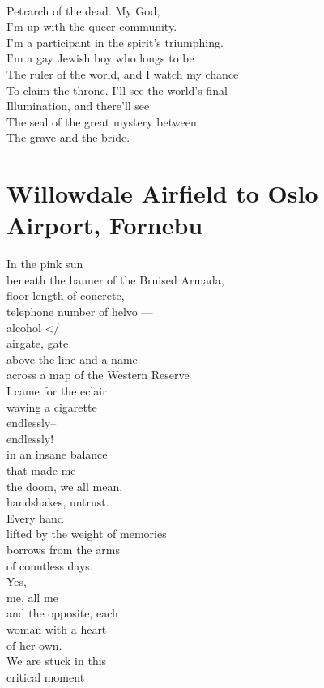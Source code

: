 \documentclass[smalldemyvopaper,11pt,twoside,onecolumn,openright,extrafontsizes]{memoir}
\begin{document}
\\Petrarch of the dead. My God,
\\I'm up with the queer community.
\\I'm a participant in the spirit's triumphing.
\\I'm a gay Jewish boy who longs to be
\\The ruler of the world, and I watch my chance
\\To claim the throne. I'll see the world's final
\\Illumination, and there'll see
\\The seal of the great mystery between
\\The grave and the bride.



\chapter{Willowdale Airfield to Oslo Airport, Fornebu}
In the pink sun
\\beneath the banner of the Bruised Armada,
\\floor length of concrete,
\\telephone number of helvo ---
\\alcohol </
\\airgate, gate
\\above the line and a name
\\across a map of the Western Reserve
\\I came for the eclair
\\waving a cigarette
\\endlessly--
\\endlessly!
\\in an insane balance
\\that made me
\\the doom, we all mean,
\\handshakes, untrust.
\\Every hand
\\lifted by the weight of memories
\\borrows from the arms
\\of countless days.
\\Yes,
\\me, all me
\\and the opposite, each
\\woman with a heart
\\of her own.
\\We are stuck in this
\\critical moment
\end{document}
